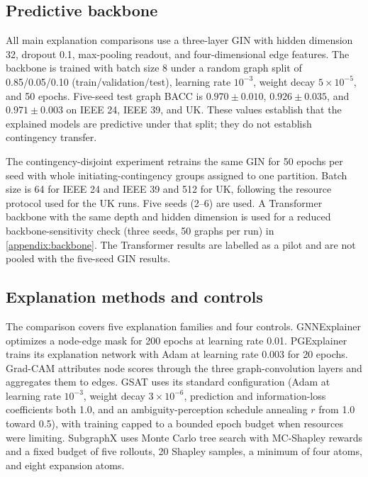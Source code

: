 \subsection{Predictive backbone}\label{predictive_backbone}

All main explanation comparisons use a three-layer GIN with hidden dimension 32, dropout 0.1, max-pooling readout, and four-dimensional edge features. The backbone is trained with batch size 8 under a random graph split of 0.85/0.05/0.10 (train/validation/test), learning rate $10^{-3}$, weight decay $5\times10^{-5}$, and 50 epochs. Five-seed test graph BACC is $0.970\pm0.010$, $0.926\pm0.035$, and $0.971\pm0.003$ on IEEE 24, IEEE 39, and UK. These values establish that the explained models are predictive under that split; they do not establish contingency transfer.

The contingency-disjoint experiment retrains the same GIN for 50 epochs per seed with whole initiating-contingency groups assigned to one partition. Batch size is 64 for IEEE 24 and IEEE 39 and 512 for UK, following the resource protocol used for the UK runs. Five seeds (2--6) are used. A Transformer backbone with the same depth and hidden dimension is used for a reduced backbone-sensitivity check (three seeds, 50 graphs per run) in \ref{appendix:backbone}. The Transformer results are labelled as a pilot and are not pooled with the five-seed GIN results.

\subsection{Explanation methods and controls}\label{explanation_baselines}

The comparison covers five explanation families and four controls. GNNExplainer optimizes a node-edge mask for 200 epochs at learning rate 0.01. PGExplainer trains its explanation network with Adam at learning rate 0.003 for 20 epochs. Grad-CAM attributes node scores through the three graph-convolution layers and aggregates them to edges. GSAT uses its standard configuration (Adam at learning rate $10^{-3}$, weight decay $3\times10^{-6}$, prediction and information-loss coefficients both 1.0, and an ambiguity-perception schedule annealing $r$ from 1.0 toward 0.5), with training capped to a bounded epoch budget when resources were limiting. SubgraphX uses Monte Carlo tree search with MC-Shapley rewards and a fixed budget of five rollouts, 20 Shapley samples, a minimum of four atoms, and eight expansion atoms.

